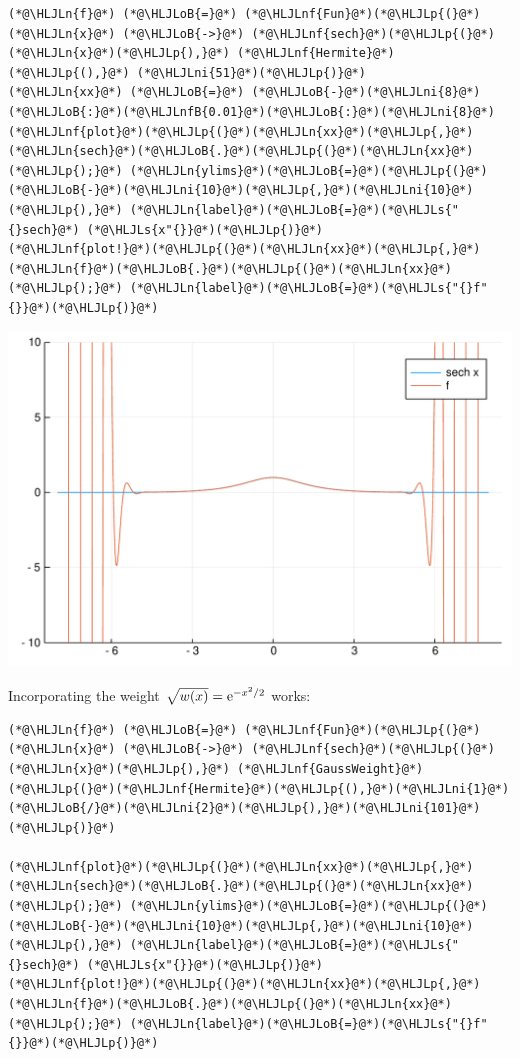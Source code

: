 \documentclass[12pt,a4paper]{article}
\newcommand{\HLJLn}[1]{#1}
\newcommand{\HLJLnf}[1]{\textcolor[RGB]{66,102,213}{#1}}
\newcommand{\HLJLs}[1]{\textcolor[RGB]{201,61,57}{#1}}
\newcommand{\HLJLnfB}[1]{\textcolor[RGB]{59,151,46}{#1}}
\newcommand{\HLJLni}[1]{\textcolor[RGB]{59,151,46}{#1}}
\newcommand{\HLJLoB}[1]{\textcolor[RGB]{102,102,102}{\textbf{#1}}}
\newcommand{\HLJLp}[1]{#1}
\def\E{ {\rm e} }
\begin{document}
\begin{lstlisting}
(*@\HLJLn{f}@*) (*@\HLJLoB{=}@*) (*@\HLJLnf{Fun}@*)(*@\HLJLp{(}@*)(*@\HLJLn{x}@*) (*@\HLJLoB{->}@*) (*@\HLJLnf{sech}@*)(*@\HLJLp{(}@*)(*@\HLJLn{x}@*)(*@\HLJLp{),}@*) (*@\HLJLnf{Hermite}@*)(*@\HLJLp{(),}@*) (*@\HLJLni{51}@*)(*@\HLJLp{)}@*)
(*@\HLJLn{xx}@*) (*@\HLJLoB{=}@*) (*@\HLJLoB{-}@*)(*@\HLJLni{8}@*)(*@\HLJLoB{:}@*)(*@\HLJLnfB{0.01}@*)(*@\HLJLoB{:}@*)(*@\HLJLni{8}@*)
(*@\HLJLnf{plot}@*)(*@\HLJLp{(}@*)(*@\HLJLn{xx}@*)(*@\HLJLp{,}@*) (*@\HLJLn{sech}@*)(*@\HLJLoB{.}@*)(*@\HLJLp{(}@*)(*@\HLJLn{xx}@*)(*@\HLJLp{);}@*) (*@\HLJLn{ylims}@*)(*@\HLJLoB{=}@*)(*@\HLJLp{(}@*)(*@\HLJLoB{-}@*)(*@\HLJLni{10}@*)(*@\HLJLp{,}@*)(*@\HLJLni{10}@*)(*@\HLJLp{),}@*) (*@\HLJLn{label}@*)(*@\HLJLoB{=}@*)(*@\HLJLs{"{}sech}@*) (*@\HLJLs{x"{}}@*)(*@\HLJLp{)}@*)
(*@\HLJLnf{plot!}@*)(*@\HLJLp{(}@*)(*@\HLJLn{xx}@*)(*@\HLJLp{,}@*) (*@\HLJLn{f}@*)(*@\HLJLoB{.}@*)(*@\HLJLp{(}@*)(*@\HLJLn{xx}@*)(*@\HLJLp{);}@*) (*@\HLJLn{label}@*)(*@\HLJLoB{=}@*)(*@\HLJLs{"{}f"{}}@*)(*@\HLJLp{)}@*)
\end{lstlisting}

\includegraphics[width=\linewidth]{figures/Lecture24_2_1.pdf}

Incorporating the weight $\sqrt{w(x)} = \E^{-x^2/2}$ works:


\begin{lstlisting}
(*@\HLJLn{f}@*) (*@\HLJLoB{=}@*) (*@\HLJLnf{Fun}@*)(*@\HLJLp{(}@*)(*@\HLJLn{x}@*) (*@\HLJLoB{->}@*) (*@\HLJLnf{sech}@*)(*@\HLJLp{(}@*)(*@\HLJLn{x}@*)(*@\HLJLp{),}@*) (*@\HLJLnf{GaussWeight}@*)(*@\HLJLp{(}@*)(*@\HLJLnf{Hermite}@*)(*@\HLJLp{(),}@*)(*@\HLJLni{1}@*)(*@\HLJLoB{/}@*)(*@\HLJLni{2}@*)(*@\HLJLp{),}@*)(*@\HLJLni{101}@*)(*@\HLJLp{)}@*)

(*@\HLJLnf{plot}@*)(*@\HLJLp{(}@*)(*@\HLJLn{xx}@*)(*@\HLJLp{,}@*) (*@\HLJLn{sech}@*)(*@\HLJLoB{.}@*)(*@\HLJLp{(}@*)(*@\HLJLn{xx}@*)(*@\HLJLp{);}@*) (*@\HLJLn{ylims}@*)(*@\HLJLoB{=}@*)(*@\HLJLp{(}@*)(*@\HLJLoB{-}@*)(*@\HLJLni{10}@*)(*@\HLJLp{,}@*)(*@\HLJLni{10}@*)(*@\HLJLp{),}@*) (*@\HLJLn{label}@*)(*@\HLJLoB{=}@*)(*@\HLJLs{"{}sech}@*) (*@\HLJLs{x"{}}@*)(*@\HLJLp{)}@*)
(*@\HLJLnf{plot!}@*)(*@\HLJLp{(}@*)(*@\HLJLn{xx}@*)(*@\HLJLp{,}@*) (*@\HLJLn{f}@*)(*@\HLJLoB{.}@*)(*@\HLJLp{(}@*)(*@\HLJLn{xx}@*)(*@\HLJLp{);}@*) (*@\HLJLn{label}@*)(*@\HLJLoB{=}@*)(*@\HLJLs{"{}f"{}}@*)(*@\HLJLp{)}@*)
\end{lstlisting}
\end{document}
